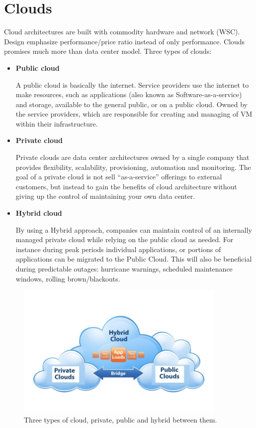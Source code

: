 \documentclass[12pt]{report}
\begin{document}
\chapter{Clouds} \label{chap:clouds}
Cloud architectures are built with commodity hardware and network (WSC). Design emphasize performance/price ratio instead of only performance. Clouds promises much more than data center model.
Three types of clouds:
\begin{itemize}
\item \textbf{Public cloud}

			A public cloud is basically the internet. Service providers use the internet to make resources, such as applications (also known as Software-as-a-service) and storage, available to the general public, or on a public cloud. Owned by the service providers, which are responsible for creating and managing of VM within their infrastructure.
\item \textbf{Private cloud}

			Private clouds are data center architectures owned by a single company that provides flexibility, scalability, provisioning, automation and monitoring.  The goal of a private cloud is not sell “as-a-service” offerings to external customers, but instead to gain the benefits of cloud architecture without giving up the control of maintaining your own data center.
\item \textbf{Hybrid cloud}

			By using a Hybrid approach, companies can maintain control of an internally managed private cloud while relying on the public cloud as needed.  For instance during peak periods individual applications, or portions of applications can be migrated to the Public Cloud.  This will also be beneficial during predictable outages: hurricane warnings, scheduled maintenance windows, rolling brown/blackouts.
\end{itemize}

\begin{figure}[ht]
		\centering
           \includegraphics[width=0.9\textwidth]{cloud.png}
         \caption{Three types of cloud, private, public and hybrid between them.}
         \label{cloud}
\end{figure} 
\end{document}
